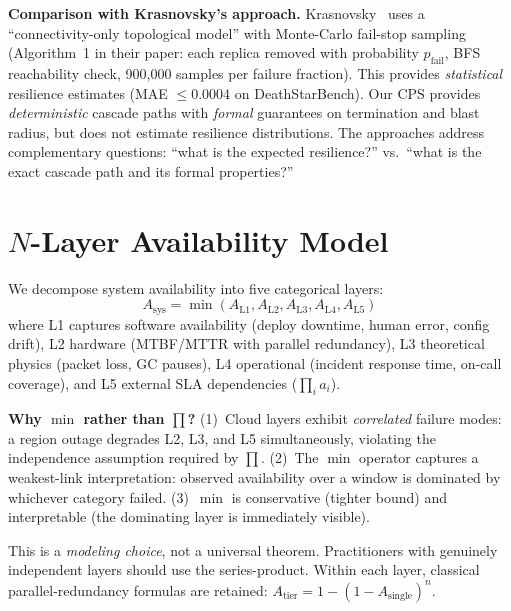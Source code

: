 \documentclass[conference,10pt]{IEEEtran}
\begin{document}
\textbf{Comparison with Krasnovsky's approach.}
Krasnovsky~\cite{krasnovsky2026} uses a ``connectivity-only
topological model'' with Monte-Carlo fail-stop sampling
(Algorithm~1 in their paper: each replica removed with probability
$p_{\text{fail}}$, BFS reachability check, 900{,}000 samples per
failure fraction). This provides \emph{statistical} resilience
estimates (MAE $\le 0.0004$ on DeathStarBench). Our CPS provides
\emph{deterministic} cascade paths with \emph{formal} guarantees
on termination and blast radius, but does not estimate resilience
distributions. The approaches address complementary questions:
``what is the expected resilience?'' vs.\ ``what is the exact
cascade path and its formal properties?''

\section{$N$-Layer Availability Model}\label{sec:avail}

We decompose system availability into five categorical layers:
\begin{equation}\label{eq:avail}
  A_{\text{sys}} = \min(A_{\text{L1}}, A_{\text{L2}},
  A_{\text{L3}}, A_{\text{L4}}, A_{\text{L5}})
\end{equation}
where L1 captures software availability (deploy downtime, human error,
config drift), L2 hardware (MTBF/MTTR with parallel redundancy),
L3 theoretical physics (packet loss, GC pauses), L4 operational
(incident response time, on-call coverage), and L5 external SLA
dependencies ($\prod_i a_i$).

\textbf{Why $\min$ rather than $\prod$?}
(1)~Cloud layers exhibit \emph{correlated} failure modes: a region
outage degrades L2, L3, and L5 simultaneously, violating the
independence assumption required by $\prod$.
(2)~The $\min$ operator captures a weakest-link interpretation:
observed availability over a window is dominated by whichever
category failed.
(3)~$\min$ is conservative (tighter bound) and interpretable
(the dominating layer is immediately visible).

This is a \emph{modeling choice}, not a universal theorem.
Practitioners with genuinely independent layers should use the
series-product. Within each layer, classical parallel-redundancy
formulas are retained: $A_{\text{tier}} = 1 - (1 - A_{\text{single}})^n$.
\end{document}
